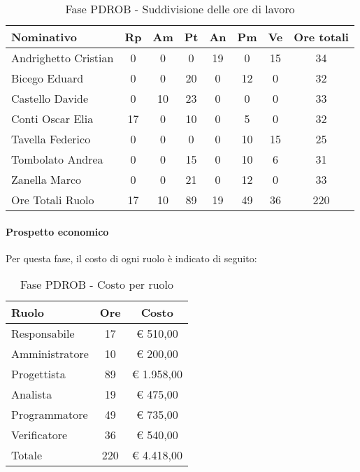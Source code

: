 \documentclass[../PianoProgetto.tex]{subfiles}
\begin{document}
					\begin{table}[h]
		\centering
	
		\begin{tabular}{l * {7}{c}}
			\toprule
			Nominativo & Rp & Am & Pt & An & Pm & Ve & Ore totali \\
			\midrule
			Andrighetto Cristian & 0 &	0 &	0 &	19 & 0 & 15 & 34 \\
			\midrule
			Bicego Eduard & 0 &	0 &	20 & 0 & 12 & 0 & 32 \\
			\midrule
			Castello Davide & 0 & 10 & 23 &	0 &	0 &	0 &	33 \\
			\midrule
			Conti Oscar Elia & 17 &	0 &	10 & 0 & 5 & 0 & 32 \\
			\midrule
			Tavella Federico &	0 &	0 &	0 &	0 &	10 & 15 & 25 \\
			\midrule
			Tombolato Andrea & 0 & 0 &	15 & 0 & 10 & 6 & 31 \\
			\midrule
			Zanella Marco & 0 & 0 &	21 & 0 & 12 & 0 & 33 \\
			\midrule			
			Ore Totali Ruolo & 17 & 10 & 89 & 19 & 49 &	36 & 220 \\
			\bottomrule
			
		\end{tabular}
		
		\caption{Fase PDROB - Suddivisione delle ore di lavoro}
		\label{tab:fasePDROB_ore}
		
	\end{table}
	
	\paragraph{Prospetto economico}
					Per questa fase, il costo di ogni ruolo è indicato di seguito:
					\begin{table}[h]
		\centering
	
		\begin{tabular}{l * {2}{c}}
			\toprule
			Ruolo & Ore & Costo \\
			\midrule
			Responsabile &	17 & \euro{} 510,00 \\
			\midrule
			Amministratore & 10 & \euro{} 200,00 \\
			\midrule
			Progettista & 89 & \euro{} 1.958,00 \\
			\midrule
			Analista & 19 & \euro{} 475,00 \\
			\midrule
			Programmatore & 49 & \euro{} 735,00 \\
			\midrule
			Verificatore & 36 & \euro{} 540,00 \\
			\midrule		
			Totale & 220 & \euro{} 4.418,00 \\
			\bottomrule
			
		\end{tabular}
		
		\caption{Fase PDROB - Costo per ruolo}
		\label{tab:fasePDROB_costo}
		
	\end{table}
	
\end{document}
